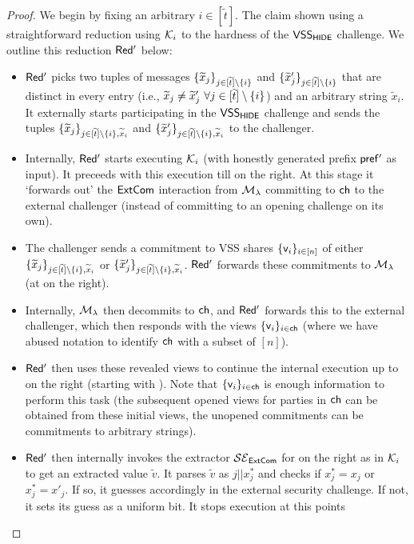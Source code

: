 \begin{proof}
We begin by fixing an arbitrary $i \in [\tilde{t}]$. The claim shown using a straightforward reduction using $\mathcal{K}_i$ to the hardness of the $\mathsf{VSS}_\mathsf{HIDE}$ challenge. We outline this reduction $\mathsf{Red'}$ below: 
\begin{itemize}
    \item $\mathsf{Red'}$ picks two tuples of messages $\{\widetilde{x}_j\}_{j \in [\widetilde{t}] \setminus \{i\}}$ and $\{\widetilde{x}'_j\}_{j \in [\widetilde{t}] \setminus \{i\}}$ that are distinct in every entry (i.e., $\widetilde{x}_j \neq \widetilde{x}'_j ~\forall j \in [\widetilde{t}] \setminus \{i\}$) and an arbitrary string $\tilde{x}_i$. 
    It externally starts participating in the $\mathsf{VSS}_\mathsf{HIDE}$ challenge 
    and sends the tuples $\{\widetilde{x}_j\}_{j \in [\widetilde{t}] \setminus \{i\},\widetilde{x}_i}$ and $\{\widetilde{x}'_j\}_{j \in [\widetilde{t}] \setminus \{i\},\widetilde{x}_i}$ to the challenger. 
    \item Internally, $\mathsf{Red'}$ starts executing $\mathcal{K}_i$ (with honestly generated prefix $\mathsf{pref'}$ as input). It preceeds with this execution till  on the right. At this stage it `forwards out' the $\mathsf{ExtCom}$ interaction from $\mathcal{M}_\lambda$ committing to $\mathsf{ch}$ to the external challenger (instead of committing to an opening challenge on its own). 
    \item The challenger sends a commitment to VSS shares $\{\mathsf{v}_i\}_{i \in [n]}$ of either $\{\widetilde{x}_j\}_{j \in [\widetilde{t}] \setminus \{i\},\widetilde{x}_i}$ or $\{\widetilde{x}'_j\}_{j \in [\widetilde{t}] \setminus \{i\},\widetilde{x}_i}$. $\mathsf{Red'}$ forwards these commitments to $\mathcal{M}_\lambda$ (at  on the right). 
    \item Internally, $\mathcal{M}_\lambda$ then decommits to $\mathsf{ch}$, and $\mathsf{Red'}$ forwards this to the external challenger, which then responds with the views $\{\mathsf{v}_i\}_{i \in \mathsf{ch}}$ (where we have abused notation to identify $\mathsf{ch}$ with a subset of $[n]$). 
    \item $\mathsf{Red'}$ then uses these revealed views to continue the internal execution up to  on the right (starting with ). Note that $\{\mathsf{v}_i\}_{i \in \mathsf{ch}}$ is enough information to perform this task (the subsequent opened views for parties in $\mathsf{ch}$ can be obtained from these initial views, the unopened commitments can be commitments to arbitrary strings). 
    \item $\mathsf{Red'}$ then internally invokes the extractor $\mathcal{SE}_\mathsf{ExtCom}$ for  on the right as in $\mathcal{K}_i$ to get an extracted value $\tilde{v}$. It parses $\tilde{v}$ as $j||x^*_j$ and checks if $x^*_j = x_j$ or $x^*_j = x'_j$. If so, it guesses accordingly in the external security challenge. If not, it sets its guess as a uniform bit. It stops execution at this points   
\end{itemize}


\end{proof}
